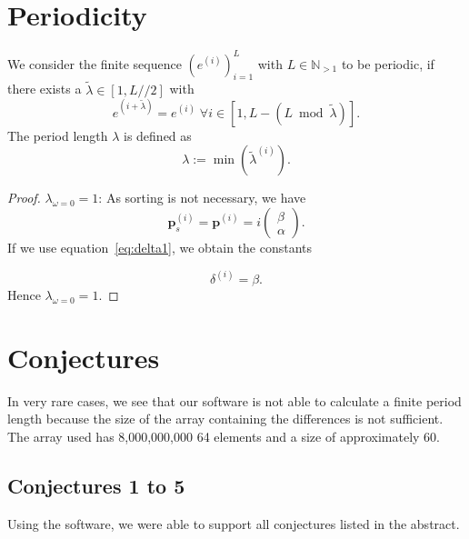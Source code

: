 \documentclass[11pt]{article}
\theoremstyle{remark}
\begin{document}
\section{Periodicity}

We consider the finite sequence $\left(e^{(i)}\right)_{i=1}^{L}$ with $L \in \mathbb{N}_{>1}$ to be periodic, if there exists a $\tilde{\lambda} \in [1, L//2]$ with 
%
\begin{equation}
e^{(i+\tilde{\lambda})} = e^{(i)} \; \forall i \in [1, L - (L \bmod \tilde{\lambda})].
\end{equation}
%
The period length $\lambda$ is defined as
%
\begin{equation}
\lambda := \min\left(\tilde{\lambda}^{(i)} \right).
\end{equation}
%
\begin{proof}
$\lambda_{\omega = 0} = 1$: As sorting is not necessary, we have
%
\begin{equation}
\mathbf{p}_s^{(i)} = \mathbf{p}^{(i)} = i \begin{pmatrix} \beta \\ \alpha \end{pmatrix}.
\end{equation}
%
If we use equation~\eqref{eq:delta1}, we obtain the constants

\begin{equation}
\delta^{(i)} = \beta.
\end{equation}
%
Hence $\lambda_{\omega = 0} = 1$.
\end{proof}

\section{Conjectures}

In very rare cases, we see that our \langc software is not able to calculate a finite period length because the size of the array containing the differences is not sufficient. The array used has 8,000,000,000 \SI{64}{\bit} elements and a size of approximately \SI{60}{\gigabyte}.

\subsection{Conjectures 1 to 5}

Using the \langc software, we were able to support all conjectures listed in the abstract.
\end{document}
